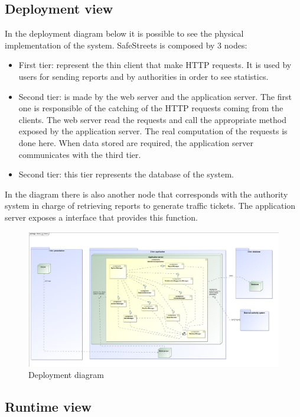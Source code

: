 \newpage

\subsection{Deployment view}
In the deployment diagram below it is possible to see the physical implementation of the system.
SafeStreets is composed by 3 nodes:
\begin{itemize}
	\item 
	First tier: represent the thin client that make HTTP requests. It is used by users for sending reports and by authorities in order to see statistics.
	\item 
	Second tier: is made by the web server and the application server. The first one is responsible of the catching of the HTTP requests coming from the clients. The web server read the requests and call the appropriate method exposed by the application server. The real computation of the requests is done here.
	When data stored are required, the application server communicates with the third tier.
	\item 
	Second tier: this tier represents the database of the system. 
\end{itemize} 

In the diagram there is also another node that corresponds with the authority system in charge of retrieving reports to generate traffic tickets. The application server exposes a interface that provides this function. 

\begin{figure}[H]
	\centering
	\includegraphics[width=1.12\linewidth]{Images/Deployment.png}
	\caption{Deployment diagram}
\end{figure}

\newpage

\subsection{Runtime view}

